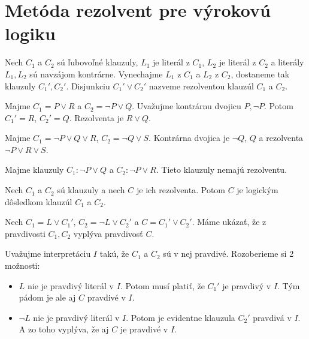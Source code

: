 \section{Metóda rezolvent pre výrokovú logiku}

\begin{definicia}[Rezolventa]
    Nech $C_1$ a $C_2$ sú ľubovoľné klauzuly, 
    $L_1$ je literál z $C_1$, $L_2$ je literál z $C_2$ a literály $L_1,L_2$
    sú navzájom kontrárne. Vynechajme $L_1$ z $C_1$ a $L_2$ z $C_2$,
    dostaneme tak klauzuly $C_1', C_2'$.
    Disjunkciu $C_1' \lor C_2'$ nazveme rezolventou klauzúl $C_1$ a $C_2$.
\end{definicia}

\begin{priklad}
    Majme $C_1 = P \lor R$ a $C_2 = \neg P \lor Q$. Uvažujme kontrárnu dvojicu
    $P,\neg P$. Potom $C_1' = R$, $C_2'=Q$. Rezolventa je $R \lor Q$.
\end{priklad}

\begin{priklad}
    Majme $C_1= \neg P \lor Q\lor R$, $C_2 = \neg Q \lor S$.
    Kontrárna dvojica je $\neg Q$, $Q$ a rezolventa $\neg P \lor R \lor S$.
\end{priklad}

\begin{priklad}
    Majme klauzuly $C_1: \neg P \lor Q$ a  $C_2: \neg P \lor R$.
    Tieto klauzuly nemajú rezolventu.
\end{priklad}

\begin{veta}
    Nech $C_1$ a $C_2$ sú klauzuly a nech $C$ je ich rezolventa.
    Potom $C$ je logickým dôsledkom klauzúl $C_1$ a $C_2$.
\end{veta}
\begin{dokaz}
    Nech $C_1 = L \lor C_1'$, $C_2 = \neg L \lor C_2'$ a 
    $C = C_1' \lor C_2'$.
    Máme ukázať, že z pravdivosti $C_1, C_2$ vyplýva pravdivosť $C$.

    Uvažujme interpretáciu $I$ takú, že $C_1$ a $C_2$ sú v nej pravdivé.
    Rozoberieme si 2 možnosti:
    \begin{itemize}
    \item $L$ nie je pravdivý literál v $I$.
        Potom musí platiť, že $C_1'$ je pravdivý v $I$. Tým pádom je ale aj
        $C$ pravdivé v $I$.

    \item $\neg L$ nie je pravdivý literál v $I$.
        Potom je evidentne klauzula $C_2'$ pravdivá v $I$. 
        A zo toho vyplýva, že aj $C$ je pravdivé v $I$.
    \end{itemize}
\end{dokaz}

